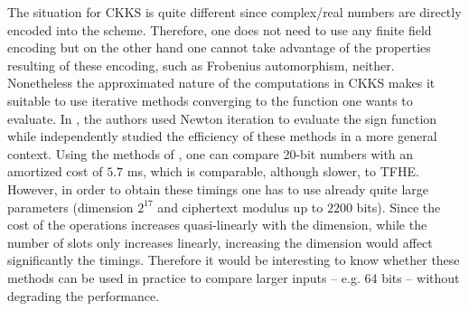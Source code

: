 The situation for CKKS is quite different since complex/real numbers are directly encoded into the scheme. Therefore, one does not need to use any finite field encoding but on the other hand one cannot take advantage of the properties resulting of these encoding, such as Frobenius automorphism, neither. Nonetheless the approximated nature of the computations in CKKS makes it suitable to use iterative methods converging to the function one wants to evaluate. In \cite{BMSZ20}, the authors used Newton iteration to evaluate the sign function while independently \cite{AC:CKKLL19,EPRINT:CheKimKim19} studied the efficiency of these methods in a more general context. Using the methods of \cite{EPRINT:CheKimKim19}, one can compare 20-bit numbers with an amortized cost of $5.7$ ms, which is comparable, although slower, to TFHE. However, in order to obtain these timings one has to use already quite large parameters (dimension $2^{17}$ and ciphertext modulus up to $2200$ bits). Since the cost of the operations increases quasi-linearly with the dimension, while the number of slots only increases linearly, increasing the dimension would affect significantly the timings. Therefore it would be interesting to know whether these methods can be used in practice to compare larger inputs -- e.g. 64 bits -- without degrading the performance. 




  

